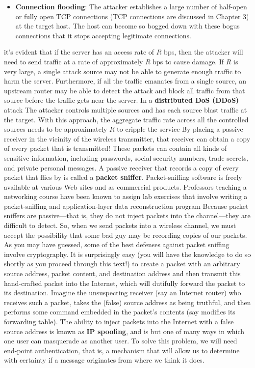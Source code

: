 \documentclass{report}
\begin{document}
\begin{itemize}
\begin{itemize}
                \item \textbf{Connection flooding}: The attacker establishes a large number of half-open or fully open TCP connections (TCP connections are discussed in Chapter 3) at the target host. The host can become so bogged down with these bogus connections that it stops accepting legitimate connections.
            \end{itemize}
            it’s evident that if the server has an access rate of $R$ bps, then the attacker will need to send traffic at a rate of approximately $R$ bps to cause damage. If $R$ is very large, a single attack source may not be able to generate enough traffic to harm the server. Furthermore, if all the traffic emanates from a single source, an upstream router may be able to detect the attack and block all traffic from that source before the traffic gets near the server. In a \textbf{distributed DoS (DDoS)} attack
            \bigbreak \noindent 
            The attacker controls multiple sources and has each source blast traffic at the target. With this approach, the aggregate traffic rate across all the controlled sources needs to be approximately $R$ to cripple the service
            \bigbreak \noindent 
            By placing a passive receiver in the vicinity of the wireless transmitter, that receiver  can obtain a copy of every packet that is transmitted! These packets can contain all kinds of sensitive information, including passwords, social security numbers, trade secrets, and private personal messages. A passive receiver that records a copy of every packet that flies by is called a \textbf{packet sniffer}.
            \bigbreak \noindent 
            Packet-sniffing software is freely available at various Web sites and as commercial products. Professors teaching a networking course have been known to assign lab exercises that involve writing a packet-sniffing and application-layer data reconstruction program
            \bigbreak \noindent 
            Because packet sniffers are passive—that is, they do not inject packets into the channel—they are difficult to detect. So, when we send packets into a wireless channel, we must accept the possibility that some bad guy may be recording copies of our packets. As you may have guessed, some of the best defenses against packet sniffing involve cryptography.
            \bigbreak \noindent 
            It is surprisingly easy (you will have the knowledge to do so shortly as you proceed through this text!) to create a packet with an arbitrary source address, packet content, and destination address and then transmit this hand-crafted packet into the Internet, which will dutifully forward the packet to its destination. Imagine the unsuspecting receiver (say an Internet router) who receives such a packet, takes the (false) source address as being truthful, and then performs some command embedded in the packet’s contents (say modifies its forwarding table). The ability to inject packets into the Internet with a false source address is known as \textbf{IP spoofing}, and is but one of many ways in which one user can masquerade as another user. To solve this problem, we will need end-point authentication, that is, a mechanism that will allow us to determine with certainty if a message originates from where we think it does.

\end{itemize}
\end{document}

